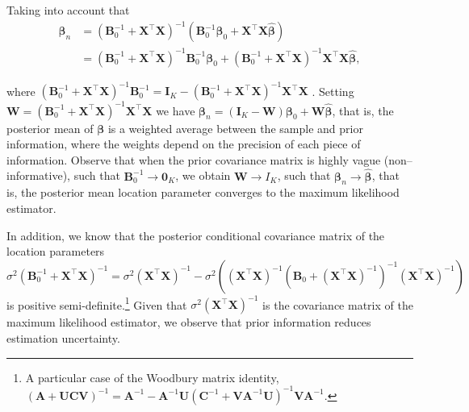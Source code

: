 Taking into account that 
\begin{align*}\bm{\beta}_n & = (\bm{B}_0^{-1} + \bm{X}^{\top}\bm{X})^{-1}(\bm{B}_0^{-1}\bm{\beta}_0 + \bm{X}^{\top}\bm{X}\hat{\bm{\beta}})\\
	& = (\bm{B}_0^{-1} + \bm{X}^{\top}\bm{X})^{-1}\bm{B}_0^{-1}\bm{\beta}_0 + (\bm{B}_0^{-1} + \bm{X}^{\top}\bm{X})^{-1} \bm{X}^{\top}\bm{X}\hat{\bm{\beta}}, 
\end{align*}

where $({\bm{B}}_0^{-1} + {\bm{X}}^{\top}{\bm{X}})^{-1}{\bm{B}}_0^{-1}=\bm{I}_K-({\bm{B}}_0^{-1} + {\bm{X}}^{\top}{\bm{X}})^{-1}{\bm{X}}^{\top}{\bm{X}}$ \cite{Smith1973}. Setting ${\bm{W}}=({\bm{B}}_0^{-1} + {\bm{X}}^{\top}{\bm{X}})^{-1}{\bm{X}}^{\top}{\bm{X}}$ we have $\bm{\beta}_n=(\bm{I}_K-{\bm{W}})\bm{\beta}_0+{\bm{W}}\hat{\bm{\beta}}$, that is, the posterior mean of $\bm{\beta}$ is a weighted average between the sample and prior information, where the weights depend on the precision of each piece of information. Observe that when the prior covariance matrix is highly vague (non--informative), such that ${\bm{B}}_0^{-1}\rightarrow \bm{0}_K$, we obtain ${\bm{W}} \rightarrow I_K$, such that $\bm{\beta}_n \rightarrow \hat{\bm{\beta}}$, that is, the posterior mean location parameter converges to the maximum likelihood estimator.

In addition, we know that the posterior conditional covariance matrix of the location parameters $\sigma^2({\bm{B}}_0^{-1} + {\bm{X}}^{\top}{\bm{X}})^{-1}=\sigma^2({\bm{X}}^{\top}{\bm{X}})^{-1}-\sigma^2\left(({\bm{X}}^{\top}{\bm{X}})^{-1}({\bm{B}}_0 + ({\bm{X}}^{\top}{\bm{X}})^{-1})^{-1}({\bm{X}}^{\top}{\bm{X}})^{-1}\right)$ is positive semi-definite.\footnote{A particular case of the Woodbury matrix identity, $(\bm{A}+\bm{U}\bm{C}\bm{V})^{-1}=\bm{A}^{-1}-\bm{A}^{-1}\bm{U}(\bm{C}^{-1}+\bm{V}\bm{A}^{-1}\bm{U})^{-1}\bm{V}\bm{A}^{-1}$.} Given that $\sigma^2({\bm{X}}^{\top}{\bm{X}})^{-1}$ is the covariance matrix of the maximum likelihood estimator, we observe that prior information reduces estimation uncertainty.

